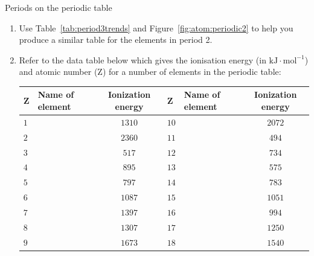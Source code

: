 \begin{exercises}{Periods on the periodic table} \noindent
\begin{enumerate}[noitemsep, label=\textbf{\arabic*}. ]
\item Use Table~\ref{tab:period3trends} and Figure~\ref{fig:atom:periodic2} to help you produce a similar table for the elements in period 2.
\item Refer to the data table below which gives the ionisation energy (in $\text{kJ} \cdot \text{mol}^{-1}$) and atomic number (Z) for a number of elements in the periodic table:\\
\begin{center}
\begin{tabular}{|l|l|c|l|l|c|}\hline
\textbf{Z} & \textbf{Name of element} & \textbf{Ionization energy} & \textbf{Z} & \textbf{Name of element} & \textbf{Ionization energy} \\\hline
$1$        &                 & $1310$              & $10$         &                 & $2072$              \\\hline
$2$        &                 & $2360$              & $11$         &                 & $494$               \\\hline
$3$        &                 & $517$               & $12$         &                 & $734$               \\\hline
$4$        &                 & $895$               & $13$         &                 & $575$               \\\hline
$5$        &                 & $797$               & $14$         &                 & $783$               \\\hline
$6$        &                 & $1087$              & $15$         &                 & $1051$              \\\hline
$7$        &                 & $1397$              & $16$         &                 & $994$               \\\hline
$8$        &                 & $1307$              & $17$         &                 & $1250$              \\\hline
$9$        &                 & $1673$              & $18$         &                 & $1540$              \\\hline
\end{tabular}
\end{center}


\end{enumerate}
\end{exercises}

